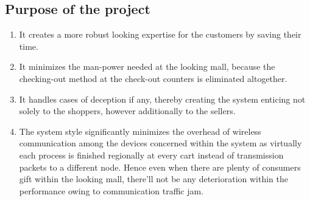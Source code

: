\documentclass[12pt]{article}
\begin{document}
\subsection{Purpose of the project}
\begin{enumerate}
\item It creates a more robust looking expertise for the customers by saving their time.
\item It minimizes the man-power needed at the looking mall, because the checking-out method at the check-out counters is eliminated altogether.
\item It handles cases of deception if any, thereby creating the system enticing not solely to the shoppers, however additionally to the sellers.
\item The system style significantly minimizes the overhead of wireless communication among the devices concerned within the system as virtually each process is finished regionally at every cart instead of transmission packets to a different node. Hence even when there are plenty of consumers gift within the looking mall, there'll not be any deterioration within the performance owing to communication traffic jam.
\end{enumerate}
\end{document}
